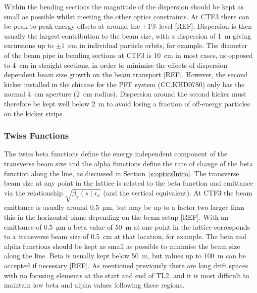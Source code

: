 Within the bending sections the magnitude of the dispersion should be kept as small as possible whilst meeting the other optics constraints. At CTF3 there can be peak-to-peak energy offsets at around the \(\pm1\%\) level [REF]. Dispersion is then usually the largest contribution to the beam size, with a dispersion of 1~m giving excursions up to \(\pm1\)~cm in individual particle orbits, for example. The diameter of the beam pipe in bending sections at CTF3 is 10~cm in most cases, as opposed to 4~cm in straight sections, in order to minimise the effects of dispersion dependent beam size growth on the beam transport [REF]. However, the second kicker installed in the chicane for the PFF system (CC.KHD0780) only has the normal 4~cm aperture (2~cm radius).  Dispersion around the second kicker must therefore be kept well below 2~m to avoid losing a fraction of off-energy particles on the kicker strips.

\subsubsection{Twiss Functions}


The twiss beta functions define the energy independent component of the transverse beam size and the alpha functions define the rate of change of the beta function along the line, as discussed in Section~\ref{s:opticsIntro}. The transverse beam size at any point in the lattice is related to the beta function and emittance via the relationship \(\sqrt{\beta_x(s)\epsilon_x}\) (and the vertical equivalent). At CTF3 the beam emittance is usually around 0.5~\(\mathrm{\mu m}\), but may be up to a factor two larger than this in the horizontal plane depending on the beam setup [REF]. With an emittance of 0.5~\(\mathrm{\mu m}\) a beta value of 50~m at one point in the lattice corresponds to a transverse beam size of 0.5~cm at that location, for example. The beta and alpha functions should be kept as small as possible to minimise the beam size along the line. Beta is usually kept below 50~m, but values up to 100~m can be accepted if necessary [REF]. As mentioned previously there are long drift spaces with no focusing elements at the start and end of TL2, and it is most difficult to maintain low beta and alpha values following these regions.

